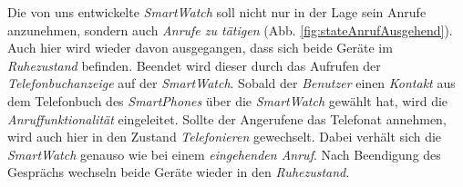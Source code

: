 Die von uns entwickelte \textit{SmartWatch} soll nicht nur in der Lage sein Anrufe anzunehmen, sondern auch \textit{Anrufe zu tätigen} (Abb. \ref{fig:stateAnrufAusgehend}). Auch hier wird wieder davon ausgegangen, dass sich beide Geräte im \textit{Ruhezustand} befinden. Beendet wird dieser durch das Aufrufen der \textit{Telefonbuchanzeige} auf der \textit{SmartWatch}. Sobald der \textit{Benutzer} einen \textit{Kontakt} aus dem Telefonbuch des \textit{SmartPhones} über die \textit{SmartWatch} gewählt hat, wird die \textit{Anruffunktionalität} eingeleitet. Sollte der Angerufene das Telefonat annehmen, wird auch hier in den Zustand \textit{Telefonieren} gewechselt. Dabei verhält sich die \textit{SmartWatch} genauso wie bei einem \textit{eingehenden Anruf}. Nach Beendigung des Gesprächs wechseln beide Geräte wieder in den \textit{Ruhezustand}.